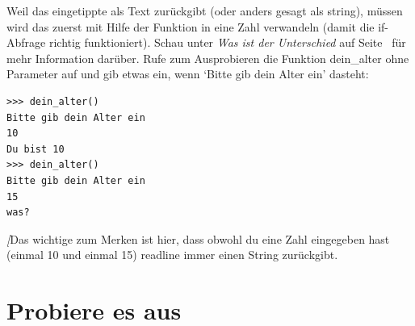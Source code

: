 Weil  das eingetippte als Text zurückgibt (oder anders gesagt als string), müssen wird das zuerst mit Hilfe der Funktion  in eine Zahl verwandeln (damit die if-Abfrage richtig funktioniert). Schau unter \emph{Was ist der Unterschied} auf Seite~\pageref{whatsthedifference} für mehr Information darüber. Rufe zum Ausprobieren die Funktion dein\_alter ohne Parameter auf und gib etwas ein, wenn `Bitte gib dein Alter ein' dasteht:

\begin{Verbatim}[frame=single]
>>> dein_alter()
Bitte gib dein Alter ein
10
Du bist 10
>>> dein_alter()
Bitte gib dein Alter ein
15
was?
\end{Verbatim}

\noindent
\emph[{Das wichtige zum Merken ist hier, dass obwohl du eine Zahl eingegeben hast (einmal 10 und einmal 15) readline immer einen String zurückgibt.}


\section{Probiere es aus}

